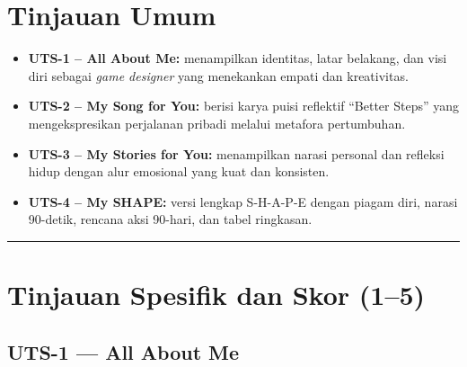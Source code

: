 \documentclass[
  letterpaper,
  DIV=11,
  numbers=noendperiod]{scrreprt}
\providecommand{\tightlist}{%
  \setlength{\itemsep}{0pt}\setlength{\parskip}{0pt}}
\begin{document}
\section{Tinjauan Umum}\label{tinjauan-umum}

\begin{itemize}
\tightlist
\item
  \textbf{UTS-1 -- All About Me:} menampilkan identitas, latar belakang,
  dan visi diri sebagai \emph{game designer} yang menekankan empati dan
  kreativitas.\\
\item
  \textbf{UTS-2 -- My Song for You:} berisi karya puisi reflektif
  ``Better Steps'' yang mengekspresikan perjalanan pribadi melalui
  metafora pertumbuhan.\\
\item
  \textbf{UTS-3 -- My Stories for You:} menampilkan narasi personal dan
  refleksi hidup dengan alur emosional yang kuat dan konsisten.\\
\item
  \textbf{UTS-4 -- My SHAPE:} versi lengkap S-H-A-P-E dengan piagam
  diri, narasi 90-detik, rencana aksi 90-hari, dan tabel ringkasan.
\end{itemize}

\begin{center}\rule{0.5\linewidth}{0.5pt}\end{center}

\section{Tinjauan Spesifik dan Skor
(1--5)}\label{tinjauan-spesifik-dan-skor-15}

\subsection{UTS-1 --- All About Me}\label{uts-1-all-about-me-1}
\end{document}

